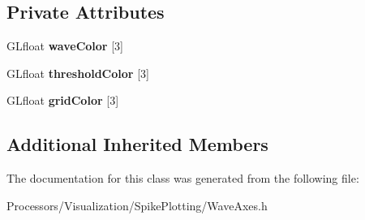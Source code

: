 \subsection*{Private Attributes}
\begin{DoxyCompactItemize}
\item 
\hypertarget{classWaveAxes_ad58b6a65b3bf0b5315d036356eefe292}{G\-Lfloat {\bfseries wave\-Color} \mbox{[}3\mbox{]}}\label{classWaveAxes_ad58b6a65b3bf0b5315d036356eefe292}

\item 
\hypertarget{classWaveAxes_acd4a9eb44178c4512d5af14fb3c0580f}{G\-Lfloat {\bfseries threshold\-Color} \mbox{[}3\mbox{]}}\label{classWaveAxes_acd4a9eb44178c4512d5af14fb3c0580f}

\item 
\hypertarget{classWaveAxes_a0de2e59894e1ac946c0b523d689fb22e}{G\-Lfloat {\bfseries grid\-Color} \mbox{[}3\mbox{]}}\label{classWaveAxes_a0de2e59894e1ac946c0b523d689fb22e}

\end{DoxyCompactItemize}
\subsection*{Additional Inherited Members}


The documentation for this class was generated from the following file\-:\begin{DoxyCompactItemize}
\item 
Processors/\-Visualization/\-Spike\-Plotting/Wave\-Axes.\-h\end{DoxyCompactItemize}
